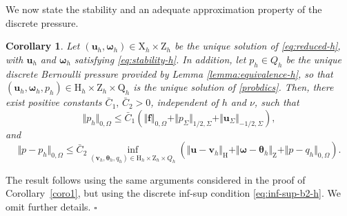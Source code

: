 \documentclass[reqno,a4paper]{article}
\numberwithin{equation}{section}
\newcommand\ff{\boldsymbol{f}}
\newcommand\bu{\boldsymbol{u}}
\newcommand\bv{\boldsymbol{v}}
\renewcommand\O{\Omega}
\renewcommand\H{\mathrm{H}}
\newcommand\Q{\mathrm{Q}}
\newcommand\Z{\mathrm{Z}}
\newcommand\X{\mathrm{X}}
\newcommand\bomega{\boldsymbol{\omega}}
\newcommand\btheta{\boldsymbol{\theta}}
\newtheorem{corollary}{Corollary}
\newenvironment{proof}{\noindent{\it Proof.}}{\hfill$\square$}
\begin{document}
We now state the stability and an adequate approximation property of the discrete pressure.
\begin{corollary}
Let $(\bu_h,\bomega_h)\in \X_h\times \Z_h$ be the unique solution
of \eqref{eq:reduced-h}, with $\bu_h$ and $\bomega_h$ satisfying \eqref{eq:stability-h}. 
In addition, let $p_h\in Q_h$ be the unique discrete Bernoulli 
pressure provided by Lemma \ref{lemma:equivalence-h},
so that $(\bu_h,\bomega_h,p_h)\in \H_h\times \Z_h\times \Q_h$
is the unique solution of \eqref{probdics}.
Then, there exist positive constants $\bar C_1,\,\bar C_2>0$,
independent of $h$ and $\nu$, such that
\begin{equation*}
\Vert p_h\Vert_{0,\O}\le
\bar C_1(\Vert\ff\Vert_{0,\O}+\Vert p_{\Sigma}\Vert_{1/2,\Sigma}+\Vert 
\bu_{\Sigma}\Vert_{-1/2,\Sigma}),
\end{equation*}
and
\begin{equation}\label{ceaest-p}
\Vert p-p_h\Vert_{0,\O}\le\bar{C}_2\inf_{(\bv_h,\btheta_h,q_h)\in\H_h\times\Z_h\times Q_h}
(\Vert\bu-\bv_h\Vert_{\H}+\Vert\bomega-\btheta_h\Vert_{\Z}+\Vert p-q_h\Vert_{0,\O}).
\end{equation}
\end{corollary}
\begin{proof}
The result follows using the same arguments
considered in the proof of Corollary~\ref{coro1},
but using the discrete inf-sup condition \eqref{eq:inf-sup-b2-h}.
We omit further details.
\end{proof}


\end{document}
